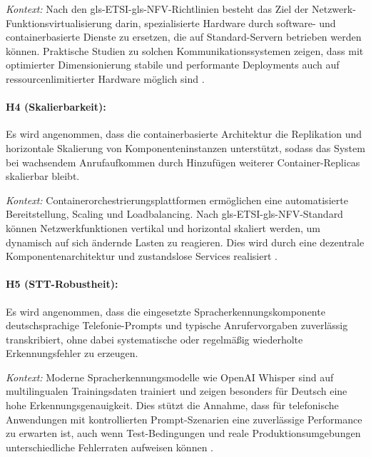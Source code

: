 \textit{Kontext:} Nach den \gls{gls-ETSI}-\gls{gls-NFV}-Richtlinien besteht das Ziel der Netzwerk-\\Funktionsvirtualisierung darin, spezialisierte Hardware durch software- und containerbasierte Dienste zu ersetzen, die auf Standard-Servern betrieben werden können. Praktische Studien zu solchen Kommunikationssystemen zeigen, dass mit optimierter Dimensionierung stabile und performante Deployments auch auf ressourcenlimitierter Hardware möglich sind \parencite{ETSI-NFV,ETSI-REL,Antonova2025}.

\paragraph{H4 (Skalierbarkeit):} Es wird angenommen, dass die containerbasierte Architektur die Replikation und horizontale Skalierung von Komponenteninstanzen unterstützt, sodass das System bei wachsendem Anrufaufkommen durch Hinzufügen weiterer Container-Replicas skalierbar bleibt.

\textit{Kontext:} Containerorchestrierungsplattformen ermöglichen eine automatisierte Bereitstellung, Scaling und Loadbalancing. Nach \gls{gls-ETSI}-\gls{gls-NFV}-Standard können Netzwerkfunktionen vertikal und horizontal skaliert werden, um dynamisch auf sich ändernde Lasten zu reagieren. Dies wird durch eine dezentrale Komponentenarchitektur und zustandslose Services realisiert \parencite{ETSI-NFV,ETSI-REL,Antonova2025}.

\paragraph{H5 (STT-Robustheit):} Es wird angenommen, dass die eingesetzte Spracherkennungskomponente deutschsprachige Telefonie-Prompts und typische Anrufervorgaben zuverlässig transkribiert, ohne dabei systematische oder regelmä\ss ig wiederholte Erkennungsfehler zu erzeugen.

\textit{Kontext:} Moderne Spracherkennungsmodelle wie OpenAI Whisper sind auf multilingualen Trainingsdaten trainiert und zeigen besonders für Deutsch eine hohe Erkennungsgenauigkeit. Dies stützt die Annahme, dass für telefonische Anwendungen mit kontrollierten Prompt-Szenarien eine zuverlässige Performance zu erwarten ist, auch wenn Test-Bedingungen und reale Produktionsumgebungen unterschiedliche Fehlerraten aufweisen können \parencite{whisper_quant_2025}.
